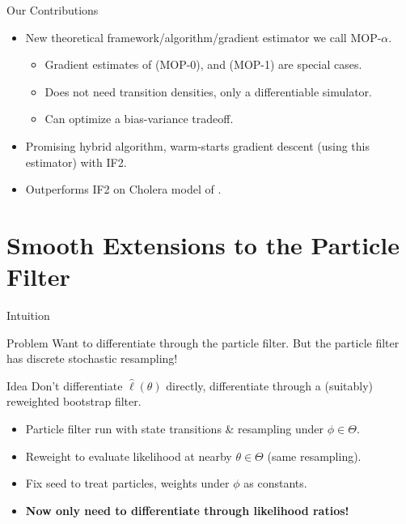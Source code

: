 \documentclass{beamer}
\begin{document}
\begin{frame}{Our Contributions}
    \begin{itemize}
        \item New theoretical framework/algorithm/gradient estimator we call MOP-$\alpha$.
        \begin{itemize}
            \item \pause Gradient estimates of \cite{naesseth18} (MOP-0), \cite{poyiadjis11} and \cite{scibior21} (MOP-1) are special cases.
            \item \pause Does not need transition densities, only a differentiable simulator.
            \item \pause Can optimize a bias-variance tradeoff. 
        \end{itemize}
        \item \pause Promising hybrid algorithm, warm-starts gradient descent (using this estimator) with IF2.
        \item \pause Outperforms IF2 on Cholera model of \cite{king08}.
    \end{itemize}
\end{frame}


\section{Smooth Extensions to the Particle Filter}

\begin{frame}{Intuition}
    \begin{block}{Problem}
        Want to differentiate through the particle filter. But the particle filter has discrete stochastic resampling! 
    \end{block}
    \pause 
    \begin{block}{Idea}
        Don't differentiate $\hat\ell(\theta)$ directly, differentiate through a (suitably) reweighted bootstrap filter.
    \end{block}
    \begin{itemize}
        \item \pause Particle filter run with state transitions \& resampling under $\phi \in \Theta$. 
        \item \pause Reweight to evaluate likelihood at nearby $\theta \in \Theta$ (same resampling).
        \item \pause Fix seed to treat particles, weights under $\phi$ as constants.
        \item \pause \textbf{Now only need to differentiate through likelihood ratios!}
    \end{itemize}
\end{frame}
\end{document}
